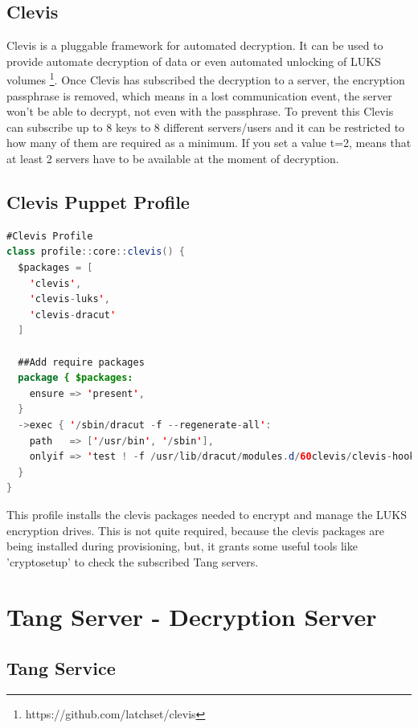 \newpage
\subsection{Clevis}

Clevis is a pluggable framework for automated decryption. It can be used to provide automate decryption of data or even automated unlocking of LUKS volumes \footnote[2]{https://github.com/latchset/clevis}.
Once Clevis has subscribed the decryption to a server, the encryption passphrase is removed, which means in a lost communication event, the server won't be able to decrypt, not even with the passphrase. To prevent this Clevis can subscribe up to 8 keys to 8 different servers/users and it can be restricted to how many of them are required as a minimum. If you set a value t=2, means that at least 2 servers have to be available at the moment of decryption.


\subsection{Clevis Puppet Profile}
\begin{lstlisting}[language=Java]
#Clevis Profile
class profile::core::clevis() {
  $packages = [
    'clevis',
    'clevis-luks',
    'clevis-dracut'
  ]

  ##Add require packages
  package { $packages:
    ensure => 'present',
  }
  ->exec { '/sbin/dracut -f --regenerate-all':
    path   => ['/usr/bin', '/sbin'],
    onlyif => 'test ! -f /usr/lib/dracut/modules.d/60clevis/clevis-hook.sh'
  }
}
\end{lstlisting}

This profile installs the clevis packages needed to encrypt and manage the LUKS encryption drives. This is not quite required, because the clevis packages are being installed during provisioning, but, it grants some useful tools like 'cryptosetup' to check the subscribed Tang servers.

\newpage
\section{Tang Server - Decryption Server}

\subsection{Tang Service}

